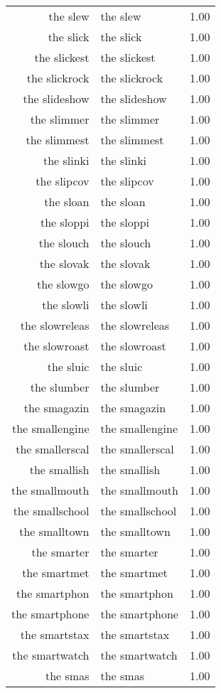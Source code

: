 \begin{table}[ht]
\begin{tabular}{rlr}
  the slew & the slew & 1.00 \\ 
  the slick & the slick & 1.00 \\ 
  the slickest & the slickest & 1.00 \\ 
  the slickrock & the slickrock & 1.00 \\ 
  the slideshow & the slideshow & 1.00 \\ 
  the slimmer & the slimmer & 1.00 \\ 
  the slimmest & the slimmest & 1.00 \\ 
  the slinki & the slinki & 1.00 \\ 
  the slipcov & the slipcov & 1.00 \\ 
  the sloan & the sloan & 1.00 \\ 
  the sloppi & the sloppi & 1.00 \\ 
  the slouch & the slouch & 1.00 \\ 
  the slovak & the slovak & 1.00 \\ 
  the slowgo & the slowgo & 1.00 \\ 
  the slowli & the slowli & 1.00 \\ 
  the slowreleas & the slowreleas & 1.00 \\ 
  the slowroast & the slowroast & 1.00 \\ 
  the sluic & the sluic & 1.00 \\ 
  the slumber & the slumber & 1.00 \\ 
  the smagazin & the smagazin & 1.00 \\ 
  the smallengine & the smallengine & 1.00 \\ 
  the smallerscal & the smallerscal & 1.00 \\ 
  the smallish & the smallish & 1.00 \\ 
  the smallmouth & the smallmouth & 1.00 \\ 
  the smallschool & the smallschool & 1.00 \\ 
  the smalltown & the smalltown & 1.00 \\ 
  the smarter & the smarter & 1.00 \\ 
  the smartmet & the smartmet & 1.00 \\ 
  the smartphon & the smartphon & 1.00 \\ 
  the smartphone & the smartphone & 1.00 \\ 
  the smartstax & the smartstax & 1.00 \\ 
  the smartwatch & the smartwatch & 1.00 \\ 
  the smas & the smas & 1.00 \\ 

\end{tabular}
\end{table}
